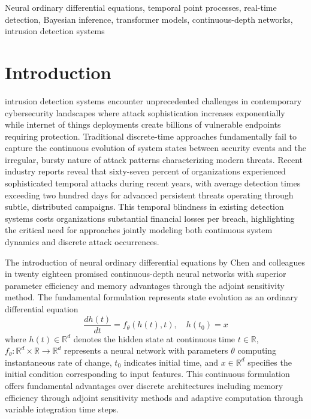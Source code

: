 \documentclass[10pt,journal,compsoc]{IEEEtran}
\newcommand{\R}{\mathbb{R}}
\begin{document}
\begin{IEEEkeywords}
Neural ordinary differential equations, temporal point processes, real-time detection, Bayesian inference, transformer models, continuous-depth networks, intrusion detection systems
\end{IEEEkeywords}

\IEEEpeerreviewmaketitle

\section{Introduction}
\label{sec:introduction}

 intrusion detection systems encounter unprecedented challenges in contemporary cybersecurity landscapes where attack sophistication increases exponentially while internet of things deployments create billions of vulnerable endpoints requiring protection. Traditional discrete-time approaches fundamentally fail to capture the continuous evolution of system states between security events and the irregular, bursty nature of attack patterns characterizing modern threats. Recent industry reports reveal that sixty-seven percent of organizations experienced sophisticated temporal attacks during recent years, with average detection times exceeding two hundred days for advanced persistent threats operating through subtle, distributed campaigns. This temporal blindness in existing detection systems costs organizations substantial financial losses per breach, highlighting the critical need for approaches jointly modeling both continuous system dynamics and discrete attack occurrences.

The introduction of neural ordinary differential equations by Chen and colleagues in twenty eighteen promised continuous-depth neural networks with superior parameter efficiency and memory advantages through the adjoint sensitivity method. The fundamental formulation represents state evolution as an ordinary differential equation
\begin{equation}
\frac{dh(t)}{dt} = f_\theta(h(t), t), \quad h(t_0) = x
\label{eq:node_basic}
\end{equation}
where $h(t) \in \R^d$ denotes the hidden state at continuous time $t \in \R$, $f_\theta: \R^d \times \R \to \R^d$ represents a neural network with parameters $\theta$ computing instantaneous rate of change, $t_0$ indicates initial time, and $x \in \R^d$ specifies the initial condition corresponding to input features. This continuous formulation offers fundamental advantages over discrete architectures including memory efficiency through adjoint sensitivity methods and adaptive computation through variable integration time steps.
\end{document}
